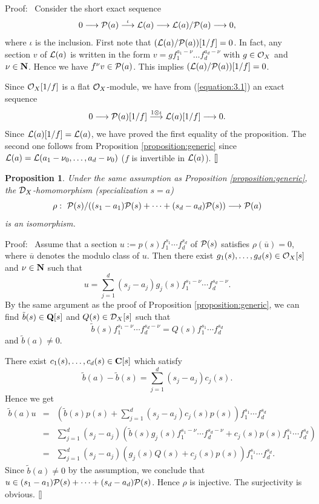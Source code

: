 \documentclass[12pt]{article}
\def\C{{\bf C}}
\def\N{ {\bf N} }
\def\Q{{\bf Q}}
\def\Dsc{ {\cal D} }
\def\Lsc{ {\cal L} }
\def\Osc{ {\cal O} }
\def\Psc{ {\cal P} }
\newenvironment{proof}{\par\noindent Proof:\ }{${\tt [}\kern-0.2mm{\tt ]}$}
\newtheorem{proposition}[theorem]{Proposition}
\begin{document}
\begin{proof}
Consider the short exact sequence
\begin{equation}
\label{equation:3.1}
0 \longrightarrow \Psc(a) \stackrel{\iota}{\longrightarrow} \Lsc(a) 
\longrightarrow
\Lsc(a)/\Psc(a) \longrightarrow 0,  
\end{equation}
where $\iota$ is the inclusion.  
First note that $(\Lsc(a)/\Psc(a))[1/f] = 0$.
In fact, any section $v$ of $\Lsc(a)$ is written in the form
$v = g f_1^{a_1-\nu}\dots f_d^{a_d-\nu}$ with $g \in \Osc_X$ and $\nu \in\N$.
Hence we have $f^\nu v \in \Psc(a)$.  
This implies $(\Lsc(a)/\Psc(a))[1/f] = 0$.

Since $\Osc_X[1/f]$ is a flat $\Osc_X$-module, 
we have from (\ref{equation:3.1}) an exact sequence 
$$ 
0 \longrightarrow \Psc(a)[1/f] 
\stackrel{1\otimes\iota} \longrightarrow \Lsc(a)[1/f] 
\longrightarrow 0.  
$$
Since $\Lsc(a)[1/f] = \Lsc(a)$, we have proved
the first equality of the proposition.
The second one follows from Proposition \ref{proposition:generic} since
$\Lsc(a) = \Lsc(a_1-\nu_0,\dots,a_d-\nu_0)$ 
($f$ is invertible in $\Lsc(a)$).
\end{proof}


\begin{proposition} \label{proposition:3.6}
Under the same assumption as Proposition \ref{proposition:generic}, 
the 
$\Dsc_X$-homomorphism (specialization $s=a$)
$$
\rho :\,\, \Psc(s)/((s_1-a_1)\Psc(s) + \dots + (s_d-a_d)\Psc(s)) 
\longrightarrow \Psc(a)
$$ 
is an isomorphism.  
\end{proposition}

\begin{proof}
Assume that a section $u := p(s)f_1^{s_1}\cdots f_d^{s_d}$ of $\Psc(s)$
satisfies $\rho(\overline u) = 0$, where $\overline u$ denotes the modulo
class of $u$. 
Then there exist $g_1(s),\dots,g_d(s) \in \Osc_X[s]$ and $\nu \in \N$ 
such that
$$
u = \sum_{j=1}^d (s_j-a_j)g_j(s) f_1^{s_1-\nu}\cdots f_d^{s_d-\nu}.
$$
By the same argument as the proof of Proposition \ref{proposition:generic},
we can find $\tilde b(s) \in \Q[s]$ and $Q(s) \in \Dsc_X[s]$ such that
$$ 
\tilde b(s) f_1^{s_1-\nu}\cdots f_d^{s_d-\nu} 
= Q(s)f_1^{s_1}\cdots f_d^{s_d}
$$
and $\tilde b(a) \neq 0$.

There exist $c_1(s),\dots,c_d(s) \in \C[s]$ which satisfy
$$ \tilde b(a) - \tilde b(s) = \sum_{j=1}^d (s_j-a_j)c_j(s).$$
Hence we get
\begin{eqnarray*}
\tilde b(a) u &=& 
\left(\tilde b(s)p(s) + \sum_{j=1}^d (s_j-a_j)c_j(s)p(s)\right)
f_1^{s_1}\cdots f_d^{s_d}\\
&=&
\sum_{j=1}^d (s_j-a_j) \left( \tilde b(s) g_j(s)
f_1^{s_1-\nu}\cdots f_d^{s_d-\nu} 
+ c_j(s)p(s)f_1^{s_1}\cdots f_d^{s_d} \right) \\
&=&
\sum_{j=1}^d (s_j-a_j)\left(g_j(s)Q(s) + c_j(s)p(s)\right) 
f_1^{s_1}\cdots f_d^{s_d}.
\end{eqnarray*}
Since $\tilde b(a) \neq 0$ by the assumption, we conclude that
$u \in (s_1-a_1)\Psc(s) + \cdots + (s_d-a_d)\Psc(s)$.  
Hence $\rho$ is injective. The surjectivity is obvious.
\end{proof}
\end{document}
